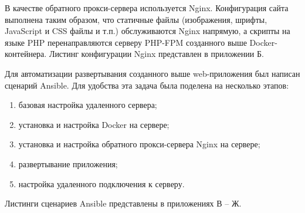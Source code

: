 В качестве обратного прокси-сервера используется Nginx. Конфигурация сайта
выполнена таким образом, что статичные файлы (изображения, шрифты, JavaScript и
CSS файлы и т.п.) обслуживаются Nginx напрямую, а скрипты на языке PHP
перенаправляются серверу PHP-FPM созданного выше Docker-контейнера. Листинг
конфигурации Nginx представлен в приложении Б.

Для автоматизации развертывания созданного выше web-приложения был написан
сценарий Ansible. Для удобства эта задача была поделена на несколько этапов:
\begin{enumerate}
    \item базовая настройка удаленного сервера;
    \item установка и настройка Docker на сервере;
    \item установка и настройка обратного прокси-сервера Nginx на сервере;
    \item развертывание приложения;
    \item настройка удаленного подключения к серверу.
\end{enumerate}

Листинги сценариев Ansible представлены в приложениях В -- Ж.
